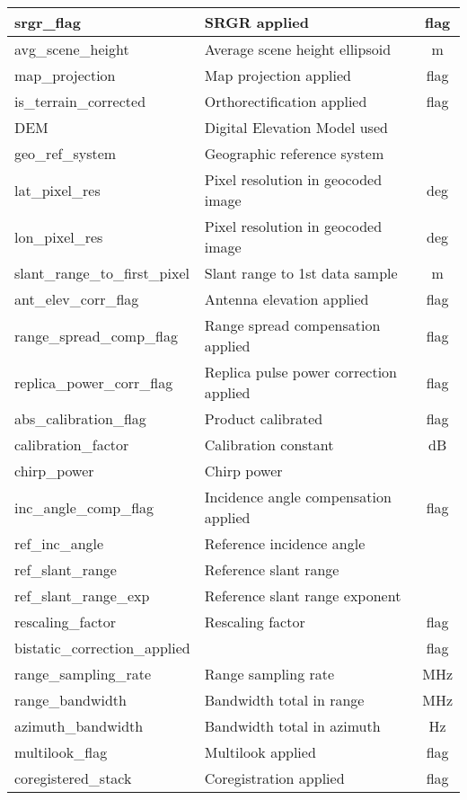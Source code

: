 \begin{longtable}[c]{|
>{\columncolor[HTML]{DADADA}}l |l|c|}
srgr\_flag & SRGR applied & flag \\ \hline
avg\_scene\_height & Average scene height ellipsoid & m \\ \hline
map\_projection & Map projection applied & flag \\ \hline
is\_terrain\_corrected & Orthorectification applied & flag \\ \hline
DEM & Digital Elevation Model used &  \\ \hline
geo\_ref\_system & Geographic reference system &  \\ \hline
lat\_pixel\_res & Pixel resolution in geocoded image & deg \\ \hline
lon\_pixel\_res & Pixel resolution in geocoded image & deg \\ \hline
slant\_range\_to\_first\_pixel & Slant range to 1st data sample & m \\ \hline
ant\_elev\_corr\_flag & Antenna elevation applied & flag \\ \hline
range\_spread\_comp\_flag & Range spread compensation applied & flag \\ \hline
replica\_power\_corr\_flag & Replica pulse power correction applied & flag \\ \hline
abs\_calibration\_flag & Product calibrated & flag \\ \hline
calibration\_factor & Calibration constant & dB \\ \hline
chirp\_power & Chirp power &  \\ \hline
inc\_angle\_comp\_flag & Incidence angle compensation applied & flag \\ \hline
ref\_inc\_angle & Reference incidence angle &  \\ \hline
ref\_slant\_range & Reference slant range &  \\ \hline
ref\_slant\_range\_exp & Reference slant range exponent &  \\ \hline
rescaling\_factor & Rescaling factor & flag \\ \hline
bistatic\_correction\_applied &  & flag \\ \hline
range\_sampling\_rate & Range sampling rate & MHz \\ \hline
range\_bandwidth & Bandwidth total in range & MHz \\ \hline
azimuth\_bandwidth & Bandwidth total in azimuth & Hz \\ \hline
multilook\_flag & Multilook applied & flag \\ \hline
coregistered\_stack & Coregistration applied & flag \\ \hline

\end{longtable}
